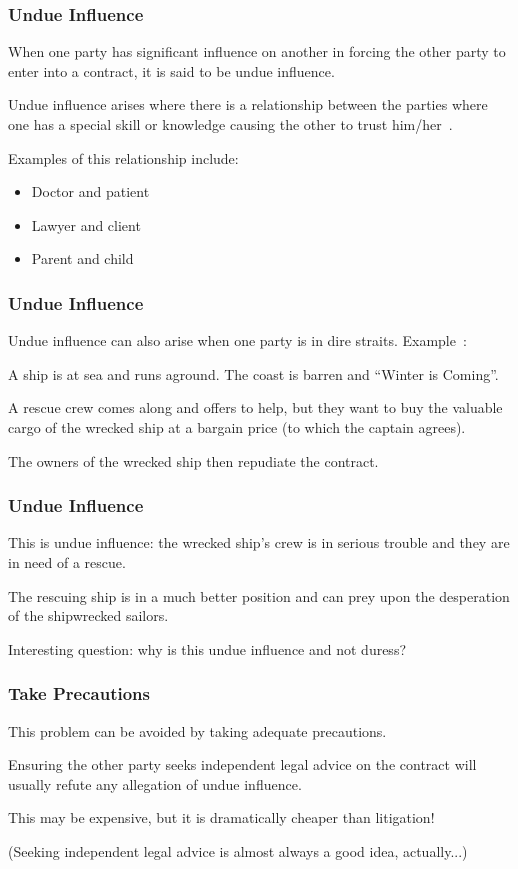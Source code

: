 \begin{frame}
\frametitle{Undue Influence}

When one party has significant influence on another in forcing the other party to enter into a contract, it is said to be undue influence.

Undue influence arises where there is a relationship between the parties where one has a special skill or knowledge causing the other to trust him/her~\cite{lba}.

Examples of this relationship include:
\begin{itemize}
	\item Doctor and patient
	\item Lawyer and client
	\item Parent and child
\end{itemize}

\end{frame}



\begin{frame}
\frametitle{Undue Influence}

Undue influence can also arise when one party is in dire straits. Example~\cite{lba}:

A ship is at sea and runs aground. The coast is barren and ``Winter is Coming''.

A rescue crew comes along and offers to help, but they want to buy the valuable cargo of the wrecked ship at a bargain price (to which the captain agrees).

The owners of the wrecked ship then repudiate the contract.

\end{frame}



\begin{frame}
\frametitle{Undue Influence}

This is undue influence: the wrecked ship's crew is in serious trouble and they are in need of a rescue.

The rescuing ship is in a much better position and can prey upon the desperation of the shipwrecked sailors.

Interesting question: why is this undue influence and not duress?

\end{frame}



\begin{frame}
\frametitle{Take Precautions}

This problem can be avoided by taking adequate precautions.

Ensuring the other party seeks independent legal advice on the contract will usually refute any allegation of undue influence.

This may be expensive, but it is dramatically cheaper than litigation!

(Seeking independent legal advice is almost always a good idea, actually...)


\end{frame}






